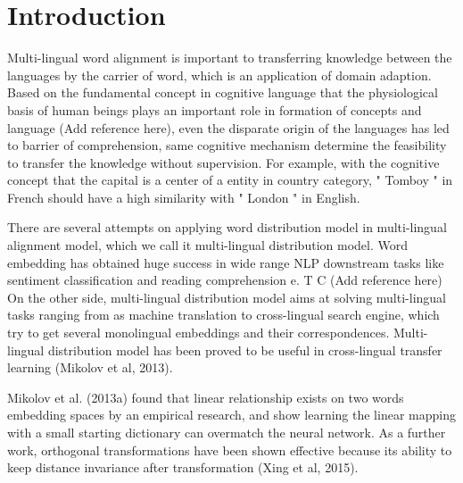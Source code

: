 \section{Introduction}

	Multi-lingual word alignment is important to transferring knowledge between the languages by the carrier of word, which is an application of domain adaption. Based on the fundamental concept in cognitive language that the physiological basis of human beings plays an important role in formation of concepts and language (Add reference here), even the disparate origin of the languages has led to barrier of comprehension, same cognitive mechanism determine the feasibility to transfer the knowledge without supervision. For example, with the cognitive concept that the capital is a center of a entity in country category, " Tomboy " in French should have a high similarity with " London " in English. 

	There are several attempts on applying word distribution model in multi-lingual alignment model, which we call it multi-lingual distribution model. Word embedding has obtained huge success in wide range NLP downstream tasks like sentiment classification and reading comprehension e. T C (Add reference here) On the other side, multi-lingual distribution model aims at solving multi-lingual tasks ranging from as machine translation to cross-lingual search engine, which try to get several monolingual embeddings and their correspondences. Multi-lingual distribution model has been proved to be useful in cross-lingual transfer learning (Mikolov et al, 2013). 

	Mikolov et al. (2013a) found that linear relationship exists on two words embedding spaces by an empirical research, and show learning the linear mapping with a small starting dictionary can overmatch the neural network. As a further work, orthogonal transformations have been shown effective because its ability to keep distance invariance after transformation (Xing et al, 2015). 

